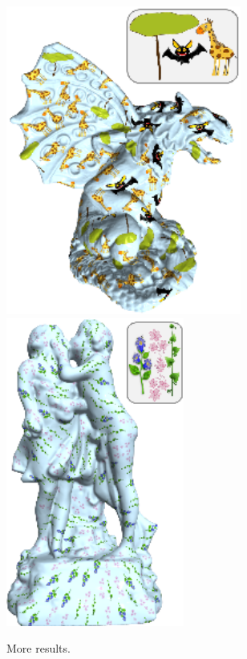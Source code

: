   \begin{figure}[htb]
  \centering
  \includegraphics[height=4in]{figs/asd/gargoyle.png}
  \includegraphics[height=4in]{figs/asd/sculpture.png}\\
  \caption{More results.}
  \label{fig:moreresults}
  \end{figure}


